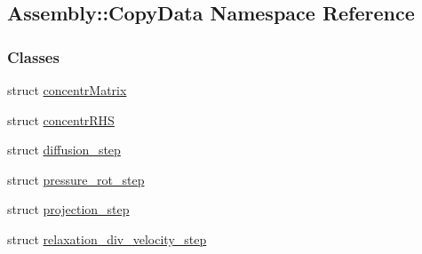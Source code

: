 \hypertarget{namespace_assembly_1_1_copy_data}{}\subsection{Assembly\+:\+:Copy\+Data Namespace Reference}
\label{namespace_assembly_1_1_copy_data}
\subsubsection*{Classes}
\begin{DoxyCompactItemize}
\item 
struct \hyperlink{struct_assembly_1_1_copy_data_1_1concentr_matrix}{concentr\+Matrix}
\item 
struct \hyperlink{struct_assembly_1_1_copy_data_1_1concentr_r_h_s}{concentr\+R\+H\+S}
\item 
struct \hyperlink{struct_assembly_1_1_copy_data_1_1diffusion__step}{diffusion\+\_\+step}
\item 
struct \hyperlink{struct_assembly_1_1_copy_data_1_1pressure__rot__step}{pressure\+\_\+rot\+\_\+step}
\item 
struct \hyperlink{struct_assembly_1_1_copy_data_1_1projection__step}{projection\+\_\+step}
\item 
struct \hyperlink{struct_assembly_1_1_copy_data_1_1relaxation__div__velocity__step}{relaxation\+\_\+div\+\_\+velocity\+\_\+step}
\end{DoxyCompactItemize}
